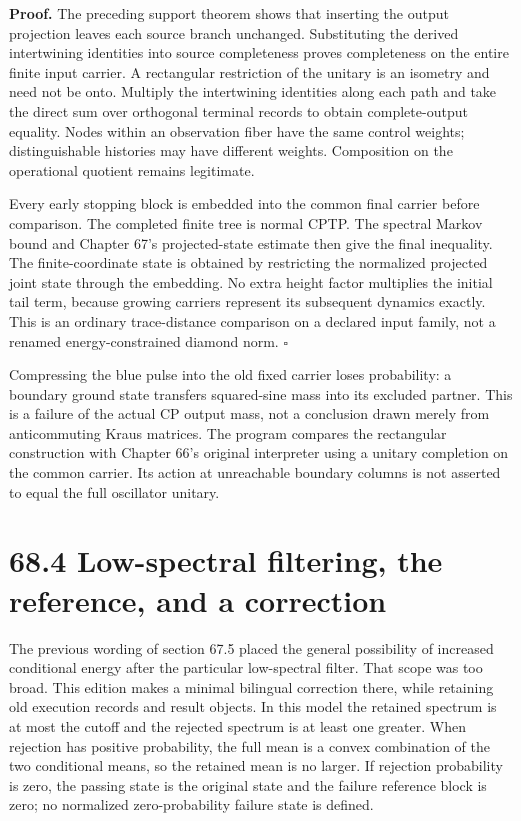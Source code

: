 \documentclass[
  11pt,
  oneside]{book}
\begin{document}
\textbf{Proof.} The preceding support theorem shows that inserting the
output projection leaves each source branch unchanged. Substituting the
derived intertwining identities into source completeness proves
completeness on the entire finite input carrier. A rectangular
restriction of the unitary is an isometry and need not be onto. Multiply
the intertwining identities along each path and take the direct sum over
orthogonal terminal records to obtain complete-output equality. Nodes
within an observation fiber have the same control weights;
distinguishable histories may have different weights. Composition on the
operational quotient remains legitimate.

Every early stopping block is embedded into the common final carrier
before comparison. The completed finite tree is normal CPTP. The
spectral Markov bound and Chapter 67's projected-state estimate then
give the final inequality. The finite-coordinate state is obtained by
restricting the normalized projected joint state through the embedding.
No extra height factor multiplies the initial tail term, because growing
carriers represent its subsequent dynamics exactly. This is an ordinary
trace-distance comparison on a declared input family, not a renamed
energy-constrained diamond norm. \(\square\)

Compressing the blue pulse into the old fixed carrier loses probability:
a boundary ground state transfers squared-sine mass into its excluded
partner. This is a failure of the actual CP output mass, not a
conclusion drawn merely from anticommuting Kraus matrices. The program
compares the rectangular construction with Chapter 66's original
interpreter using a unitary completion on the common carrier. Its action
at unreachable boundary columns is not asserted to equal the full
oscillator unitary.

\section{68.4 Low-spectral filtering, the reference, and a correction}

The previous wording of section 67.5 placed the general possibility of
increased conditional energy after the particular low-spectral filter.
That scope was too broad. This edition makes a minimal bilingual
correction there, while retaining old execution records and result
objects. In this model the retained spectrum is at most the cutoff and
the rejected spectrum is at least one greater. When rejection has
positive probability, the full mean is a convex combination of the two
conditional means, so the retained mean is no larger. If rejection
probability is zero, the passing state is the original state and the
failure reference block is zero; no normalized zero-probability failure
state is defined.
\end{document}
